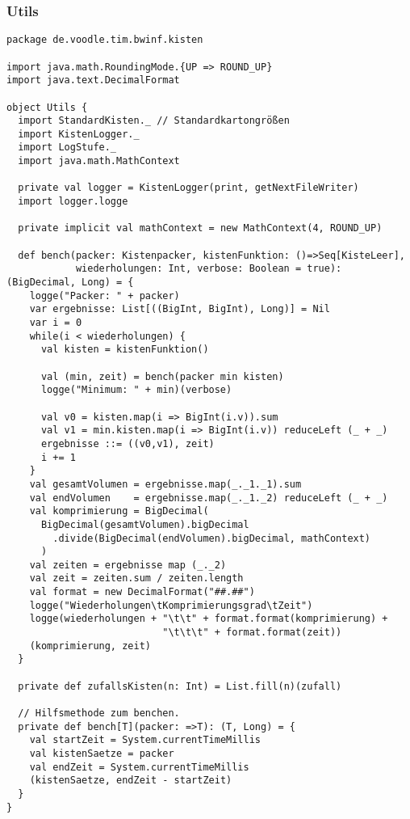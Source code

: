 \subsubsection{Utils}
\begin{lstlisting}
package de.voodle.tim.bwinf.kisten

import java.math.RoundingMode.{UP => ROUND_UP}
import java.text.DecimalFormat

object Utils {
  import StandardKisten._ // Standardkartongrößen
  import KistenLogger._
  import LogStufe._
  import java.math.MathContext

  private val logger = KistenLogger(print, getNextFileWriter)
  import logger.logge

  private implicit val mathContext = new MathContext(4, ROUND_UP)

  def bench(packer: Kistenpacker, kistenFunktion: ()=>Seq[KisteLeer],
            wiederholungen: Int, verbose: Boolean = true): (BigDecimal, Long) = {
    logge("Packer: " + packer)
    var ergebnisse: List[((BigInt, BigInt), Long)] = Nil
    var i = 0
    while(i < wiederholungen) {
      val kisten = kistenFunktion()

      val (min, zeit) = bench(packer min kisten)
      logge("Minimum: " + min)(verbose)

      val v0 = kisten.map(i => BigInt(i.v)).sum
      val v1 = min.kisten.map(i => BigInt(i.v)) reduceLeft (_ + _)
      ergebnisse ::= ((v0,v1), zeit)
      i += 1
    }
    val gesamtVolumen = ergebnisse.map(_._1._1).sum
    val endVolumen    = ergebnisse.map(_._1._2) reduceLeft (_ + _)
    val komprimierung = BigDecimal(
      BigDecimal(gesamtVolumen).bigDecimal
        .divide(BigDecimal(endVolumen).bigDecimal, mathContext)
      )
    val zeiten = ergebnisse map (_._2)
    val zeit = zeiten.sum / zeiten.length
    val format = new DecimalFormat("##.##")
    logge("Wiederholungen\tKomprimierungsgrad\tZeit")
    logge(wiederholungen + "\t\t" + format.format(komprimierung) +
                           "\t\t\t" + format.format(zeit))
    (komprimierung, zeit)
  }

  private def zufallsKisten(n: Int) = List.fill(n)(zufall)

  // Hilfsmethode zum benchen.
  private def bench[T](packer: =>T): (T, Long) = {
    val startZeit = System.currentTimeMillis
    val kistenSaetze = packer
    val endZeit = System.currentTimeMillis
    (kistenSaetze, endZeit - startZeit)
  }
}
\end{lstlisting}
